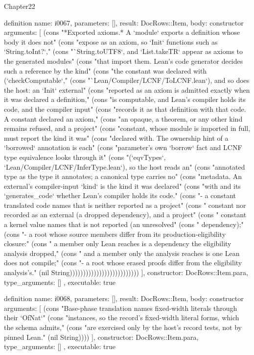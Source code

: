 \begin{lexlean}{Chapter22}
\begin{semanticmodule}
definition{
  name: i0067,
  parameters: [],
  result: DocRows::Item,
  body: constructor{
    arguments: [
      (cons "*Exported axioms.* A `module` exports a definition whose body it does not" (cons "expose as an axiom, so `Init` functions such as `String.toInt?`," (cons "`String.toUTF8`, and `List.takeTR` appear as axioms to the generated modules" (cons "that import them. Lean's code generator decides such a reference by the kind" (cons "the constant was declared with (`checkComputable`," (cons "`Lean/Compiler/LCNF/ToLCNF.lean`), and so does the host: an `Init` external" (cons "reported as an axiom is admitted exactly when it was declared a definition," (cons "is computable, and Lean's compiler holds its code, and the compiler input" (cons "records it as that definition with that code. A constant declared an axiom," (cons "an opaque, a theorem, or any other kind remains refused, and a project" (cons "constant, whose module is imported in full, must report the kind it was" (cons "declared with. The ownership hint of a `borrowed` annotation is each" (cons "parameter's own `borrow` fact and LCNF type equivalence looks through it" (cons "(`eqvTypes`, `Lean/Compiler/LCNF/InferType.lean`), so the host reads an" (cons "annotated type as the type it annotates; a canonical type carries no" (cons "metadata. An external's compiler-input `kind` is the kind it was declared" (cons "with and its `generates_code` whether Lean's compiler holds its code." (cons "- a constant translated code names that is neither reported as a project" (cons "  constant nor recorded as an external (a dropped dependency), and a project" (cons "  constant a kernel value names that is not reported (an unresolved" (cons "  dependency);" (cons "- a root whose source members differ from its production-eligibility closure:" (cons "  a member only Lean reaches is a dependency the eligibility analysis dropped," (cons "  and a member only the analysis reaches is one Lean does not compile;" (cons "- a root whose erased proofs differ from the eligibility analysis's." (nil String))))))))))))))))))))))))))
    ],
    constructor: DocRows::Item.para,
    type_arguments: []
  },
  executable: true
}

definition{
  name: i0068,
  parameters: [],
  result: DocRows::Item,
  body: constructor{
    arguments: [
      (cons "Base-phase translation names fixed-width literals through their `OfNat`" (cons "instances, so the record's fixed-width literal forms, which the schema admits," (cons "are exercised only by the host's record tests, not by pinned Lean." (nil String))))
    ],
    constructor: DocRows::Item.para,
    type_arguments: []
  },
  executable: true
}


\end{semanticmodule}
\end{lexlean}
